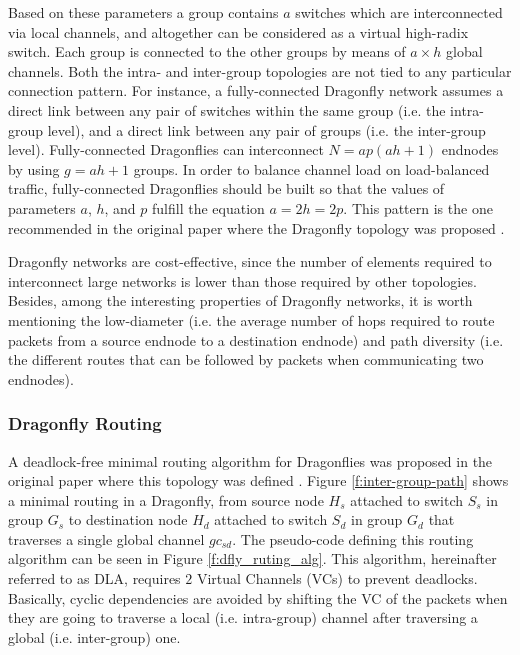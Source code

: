 \documentclass[review]{elsarticle}
\newcommand{\dflys}{Dragonflies}
\newcommand{\dfly}{Dragonfly}
\begin{document}
Based on these parameters a group contains $a$ switches which are interconnected via local channels, and altogether can be considered as a virtual high-radix switch.
Each group is connected to the other groups by means of $a\times h$ global channels.
Both the intra- and inter-group topologies are not tied to any particular connection pattern.
For instance, a fully-connected \dfly{} network assumes a direct link between any pair of switches within the same group (i.e. the intra-group level),
and a direct link between any pair of groups (i.e. the inter-group level).
Fully-connected \dflys{} can interconnect $N = ap(ah + 1)$ endnodes by using $g = ah + 1$ groups. 
In order to balance channel load on load-balanced traffic, fully-connected \dflys{} should be built so that the values of parameters $a$, $h$, and $p$ fulfill the equation $a = 2h = 2p$.
This pattern is the one recommended in the original paper where the \dfly{} topology was proposed \cite{kim_technology-driven_2008}.

\dfly{} networks are cost-effective, since the number of elements required to interconnect large networks is lower than those required by other topologies.
Besides, among the interesting properties of \dfly{} networks, it is worth mentioning the low-diameter (i.e. the average number of hops required to route packets
from a source endnode to a destination endnode) and path diversity (i.e. the different routes that can be followed by packets when communicating two endnodes).

\subsubsection{\dfly{} Routing}
\label{s_background_dfly_routing}

A deadlock-free minimal routing algorithm for \dflys{} was proposed in the original paper where this topology was defined \cite{kim_technology-driven_2008}.
Figure \ref{f:inter-group-path} shows a minimal routing in a \dfly{}, from source node $H_s$ attached to switch $S_s$ in group $G_s$ to destination node $H_d$ attached to switch $S_d$ in group $G_d$
that traverses a single global channel $gc_{sd}$. The pseudo-code defining this routing algorithm can be seen in Figure \ref{f:dfly_ruting_alg}.
This algorithm, hereinafter referred to as DLA, requires $2$ Virtual Channels (VCs) \cite{dally87_vc} to prevent deadlocks.
Basically, cyclic dependencies are avoided by shifting the VC of the packets when they are going to traverse a local (i.e. intra-group) channel after traversing a global (i.e. inter-group) one.
\end{document}

